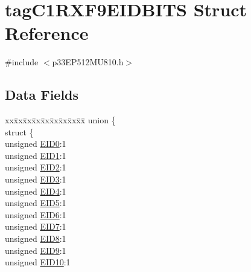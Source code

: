 \hypertarget{structtag_c1_r_x_f9_e_i_d_b_i_t_s}{}\section{tag\+C1\+R\+X\+F9\+E\+I\+D\+B\+I\+TS Struct Reference}
\label{structtag_c1_r_x_f9_e_i_d_b_i_t_s}


{\ttfamily \#include $<$p33\+E\+P512\+M\+U810.\+h$>$}

\subsection*{Data Fields}
\begin{DoxyCompactItemize}
\item 
\begin{tabbing}
xx\=xx\=xx\=xx\=xx\=xx\=xx\=xx\=xx\=\kill
union \{\\
\>struct \{\\
\>\>unsigned \hyperlink{structtag_c1_r_x_f9_e_i_d_b_i_t_s_a9da8b7b30247e4f9cd8cc056549aa9fd}{EID0}:1\\
\>\>unsigned \hyperlink{structtag_c1_r_x_f9_e_i_d_b_i_t_s_afd6c139491d147c1262f3d051c6691e9}{EID1}:1\\
\>\>unsigned \hyperlink{structtag_c1_r_x_f9_e_i_d_b_i_t_s_a36ec62d8d3c5acd5d15e6691dc099a94}{EID2}:1\\
\>\>unsigned \hyperlink{structtag_c1_r_x_f9_e_i_d_b_i_t_s_ab895f7d0ac289a0383b607cbc62eebe2}{EID3}:1\\
\>\>unsigned \hyperlink{structtag_c1_r_x_f9_e_i_d_b_i_t_s_a136d5a709d6618d40acceccb43036656}{EID4}:1\\
\>\>unsigned \hyperlink{structtag_c1_r_x_f9_e_i_d_b_i_t_s_a8dffb2d86a6c184df505ae7c71a58710}{EID5}:1\\
\>\>unsigned \hyperlink{structtag_c1_r_x_f9_e_i_d_b_i_t_s_af8a8574102515d8f1a4b7fd1685d0532}{EID6}:1\\
\>\>unsigned \hyperlink{structtag_c1_r_x_f9_e_i_d_b_i_t_s_a84c3262e67f8d5fd387ac10bde6fa9b1}{EID7}:1\\
\>\>unsigned \hyperlink{structtag_c1_r_x_f9_e_i_d_b_i_t_s_acca25e0b7d86eb499d01f85222baea87}{EID8}:1\\
\>\>unsigned \hyperlink{structtag_c1_r_x_f9_e_i_d_b_i_t_s_ac6748f73d4ada8538b06548be4f396c2}{EID9}:1\\
\>\>unsigned \hyperlink{structtag_c1_r_x_f9_e_i_d_b_i_t_s_a9cea8e77ecbb72bd3b08102412793725}{EID10}:1\\

\end{tabbing}
\end{DoxyCompactItemize}
